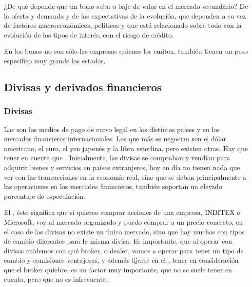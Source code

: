 ¿De qué depende que un bono suba o baje de valor en el mercado secundario? De la oferta y demanda y de las expectativas de la evolución, que dependen a su vez de factores macroeconómicos, políticos y que está relacionado sobre todo con la evolución de los tipos de interés, con el riesgo de crédito.

En los bonos no son sólo las empresas quienes los emiten, también tienen un peso específico muy grande los estados.

\subsection{Divisas y derivados financieros}

\subsubsection{Divisas}

Las  son los medios de pago de curso legal en los distintos paises y en los mercados financieros internacionales. Los que más se negocian son el dólar americano, el euro, el yen japonés y la libra esterlina, pero existen otras. Hay que tener en cuenta que . Inicialmente, las divisas se compraban y vendían para adquirir bienes y servicios en países extranjeros, hoy en día no tienen nada que ver con las transacciones en la economía real, sino que se deben principalmente a las operaciones en los mercados financieros, también soportan un elevado porcentaje de especulación.

El , ésto significa que si quiereo comprar acciones de una empresa, INDITEX o Microsoft, voy al mercado organizado y puedo comprar  a un precio concreto, en el caso de las divisas no existe un único mercado, sino que hay muchos con tipos de cambio diferentes para la misma divisa. Es importante, que al operar con divisas cuidemos con qué broker, o dealer, vamos a operar para tener un tipo de cambio y comisiones ventajosas, y además fijarse en el , tener en consideración que el broker quiebre, es un factor muy importante, que no se suele tener en cuenta, pero que no es infrecuente.

